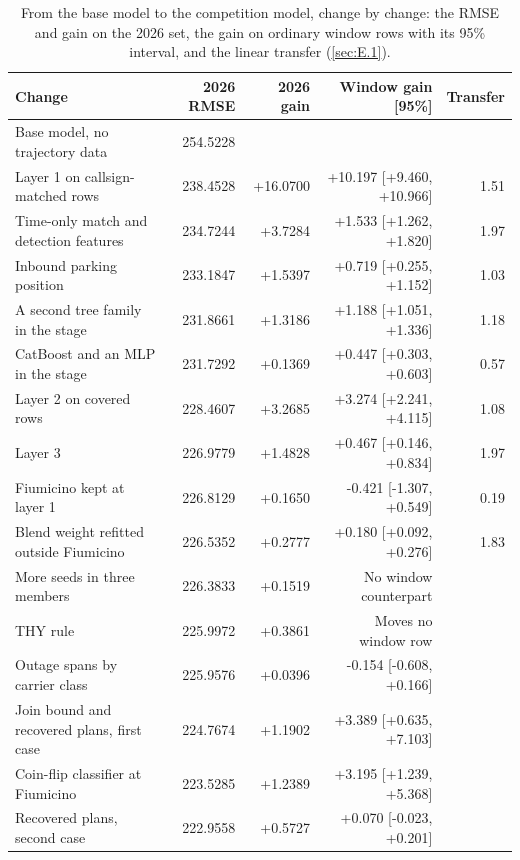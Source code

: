 \documentclass[
  manuscript=article,
  layout=preprint,
  year=2026,
  volume=x,
]{extra/joas}
\begin{document}
\begin{table}[htbp!]
  \centering
  \small
  \setlength{\tabcolsep}{5pt}\renewcommand{\arraystretch}{1.15}
  \caption{From the base model to the competition model, change by change: the RMSE and gain on the 2026 set, the gain on ordinary window rows with its 95\% interval, and the linear transfer (\ref{sec:E.1}).}
  \label{tab:15}
  \begin{tabularx}{\linewidth}{>{\raggedright\arraybackslash}Xrrrr}
  \toprule
  \textbf{Change} & \textbf{2026 RMSE} & \textbf{2026 gain} & \textbf{Window gain [95\%]} & \textbf{Transfer} \\
  \midrule
  Base model, no trajectory data & 254.5228 &  &  &  \\
  Layer 1 on callsign-matched rows & 238.4528 & +16.0700 & +10.197 {[}+9.460, +10.966{]} & 1.51 \\
  Time-only match and detection features & 234.7244 & +3.7284 & +1.533 {[}+1.262, +1.820{]} & 1.97 \\
  Inbound parking position & 233.1847 & +1.5397 & +0.719 {[}+0.255, +1.152{]} & 1.03 \\
  A second tree family in the stage & 231.8661 & +1.3186 & +1.188 {[}+1.051, +1.336{]} & 1.18 \\
  CatBoost and an MLP in the stage & 231.7292 & +0.1369 & +0.447 {[}+0.303, +0.603{]} & 0.57 \\
  Layer 2 on covered rows & 228.4607 & +3.2685 & +3.274 {[}+2.241, +4.115{]} & 1.08 \\
  Layer 3 & 226.9779 & +1.4828 & +0.467 {[}+0.146, +0.834{]} & 1.97 \\
  Fiumicino kept at layer 1 & 226.8129 & +0.1650 & -0.421 {[}-1.307, +0.549{]} & 0.19 \\
  Blend weight refitted outside Fiumicino & 226.5352 & +0.2777 & +0.180 {[}+0.092, +0.276{]} & 1.83 \\
  More seeds in three members & 226.3833 & +0.1519 & No window counterpart &  \\
  THY rule & 225.9972 & +0.3861 & Moves no window row &  \\
  Outage spans by carrier class & 225.9576 & +0.0396 & -0.154 {[}-0.608, +0.166{]} &  \\
  Join bound and recovered plans, first case & 224.7674 & +1.1902 & +3.389 {[}+0.635, +7.103{]} &  \\
  Coin-flip classifier at Fiumicino & 223.5285 & +1.2389 & +3.195 {[}+1.239, +5.368{]} &  \\
  Recovered plans, second case & 222.9558 & +0.5727 & +0.070 {[}-0.023, +0.201{]} &  \\

\end{tabularx}
\end{table}
\end{document}

